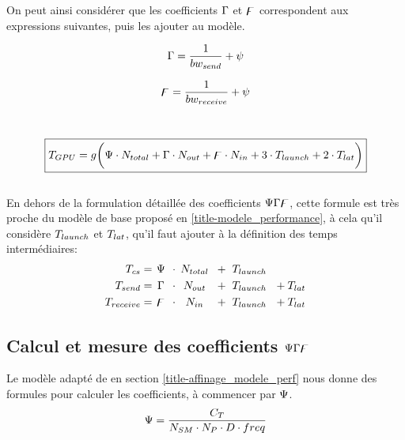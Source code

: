 On peut ainsi considérer que les coefficients $\Gamma$ et $\digamma$ correspondent aux expressions suivantes, puis les ajouter au modèle.\\

\noindent\begin{minipage}{.5\linewidth}
	\begin{equation}
	\Gamma = \frac{1}{bw_{send}} + \psi
	\end{equation}
\end{minipage}%
\begin{minipage}{.5\linewidth}
	\begin{equation}
	\digamma = \frac{1}{bw_{receive}}  + \psi
	\end{equation}
\end{minipage}\\[\baselineskip]
\begin{equation}
\boxed{T_{GPU} = g \bigg( \Psi \cdot N_{total}  + \Gamma \cdot N_{out} + \digamma \cdot N_{in} + 3\cdot T_{launch} +2\cdot T_{lat} \bigg)}
\end{equation}\\[-\baselineskip]

En dehors de la formulation détaillée des coefficients $\Psi\Gamma\digamma$, cette formule est très proche du modèle de base proposé en \ref{title-modele_performance}, à cela qu'il considère $T_{launch}$ et $T_{lat}$, qu'il faut ajouter à la définition des temps intermédiaires:
\begin{align}
\Time_{cs}           &= \text{\makebox[10pt][c]{$\cscoef$} }\cdot  \text{\makebox[30pt][c]{$N_{total}$} } + \text{\makebox[38pt][c]{$ \Time_{launch}$} } \\
\Time_{send}      &=\text{\makebox[10pt][c]{$\scoef$} }   \cdot   \text{\makebox[30pt][c]{$N_{out}$} }   + \text{\makebox[38pt][c]{$ \Time_{launch}$} }+\Time_{lat} \\
\Time_{receive} &=  \text{\makebox[10pt][c]{$\rcoef$} } \cdot  \text{\makebox[30pt][c]{$N_{in}$} }       + \text{\makebox[38pt][c]{$ \Time_{launch}$} } +\Time_{lat}
\end{align}

\subsection{Calcul et mesure des coefficients $\Psi\Gamma\digamma$ } \label{title-calcul_coeff}
Le modèle adapté de \cite{albuquerque_performance_2012} en section \ref{title-affinage_modele_perf} nous donne des formules pour calculer les coefficients, à commencer par $\Psi $.
\begin{equation*}
\Psi = \frac{C_T}{N_{SM}\cdot N_P \cdot D \cdot freq}
\end{equation*}\\[-\baselineskip]


